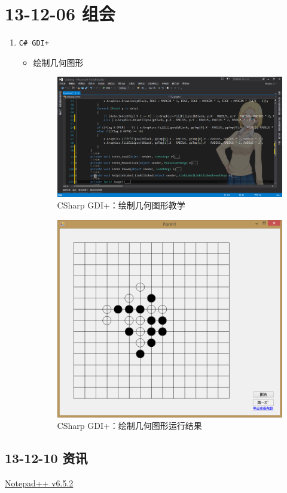 \documentclass[]{report}
\begin{document}
\section{13-12-06 组会}
\begin{enumerate}
	\item \verb|C# GDI+|
	\begin{itemize}
		\item 绘制几何图形
\begin{figure}
\centering
\includegraphics[width=1\linewidth]{./PIC/Gobang}
\caption{CSharp GDI+：绘制几何图形教学}
\label{fig:ComboBox}
\end{figure}
\begin{figure}
\centering
\includegraphics[width=0.7\linewidth]{./PIC/GobangO}
\caption{CSharp GDI+：绘制几何图形运行结果}
\label{fig:GobangO}
\end{figure}
	\end{itemize}
\end{enumerate}
	\subsection{13-12-10 资讯}
			\href{http://notepad-plus-plus.org/zh/download/v6.5.2.html}{Notepad++ v6.5.2}
\end{document}
